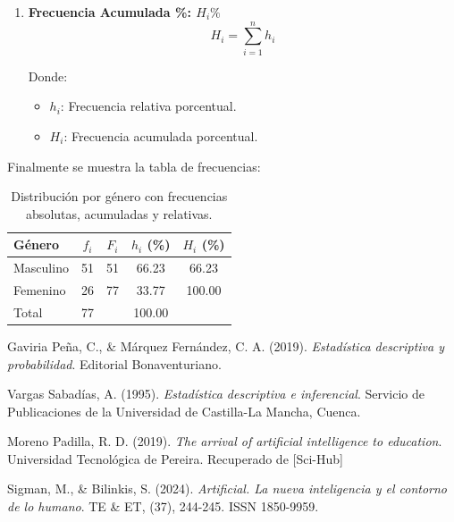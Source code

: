 \documentclass{article}
\begin{document}
\begin{multicols}{2}
\begin{enumerate}
    \item \begin{center}
      \textbf{Frecuencia Acumulada \%: $H_i\%$}
      \hrulefill
      \begin{equation*}
        H_i = \sum_{i=1}^{n} h_i
      \end{equation*}
    \end{center}
    \vspace{-1cm}
    Donde:
    \begin{itemize}
        \item $h_i$: Frecuencia relativa porcentual.
        \item $H_i$: Frecuencia acumulada porcentual.
    \end{itemize}
    \end{enumerate}
  \end{multicols}

  Finalmente se muestra la tabla de frecuencias:

  \renewcommand{\arraystretch}{1.5} %
\begin{table}[ht]
    \centering
    \begin{tabular}{l @{\hskip 0.5cm} c @{\hskip 0.5cm} c @{\hskip 0.5cm} c @{\hskip 0.5cm} c}
      \hline
      \textbf{Género} & \textbf{$f_i$} & \textbf{$F_i$} & \textbf{$h_i$ (\%)} & \textbf{$H_i$ (\%)} \\ \hline
      Masculino       & 51             & 51             & 66.23               & 66.23               \\ \hline
      Femenino        & 26             & 77             & 33.77               & 100.00              \\ \hline
      Total           & 77             &                & 100.00              &                     \\
    \end{tabular}
    \caption{Distribución por género con frecuencias absolutas, acumuladas y relativas.}
    \label{tab:genero-frecuencias}
\end{table}



\newpage

\begin{thebibliography}{9}

  Gaviria Peña, C., \& Márquez Fernández, C. A. (2019). \textit{Estadística descriptiva y probabilidad}. Editorial Bonaventuriano. 
  
  Vargas Sabadías, A. (1995). \textit{Estadística descriptiva e inferencial}. Servicio de Publicaciones de la Universidad de Castilla-La Mancha, Cuenca.

  Moreno Padilla, R. D. (2019). \textit{The arrival of artificial intelligence to education}. Universidad Tecnológica de Pereira. Recuperado de [Sci-Hub]

  Sigman, M., \& Bilinkis, S. (2024). \textit{Artificial. La nueva inteligencia y el contorno de lo humano}. TE \& ET, (37), 244-245. ISSN 1850-9959.

\end{thebibliography}

  
\end{document}
